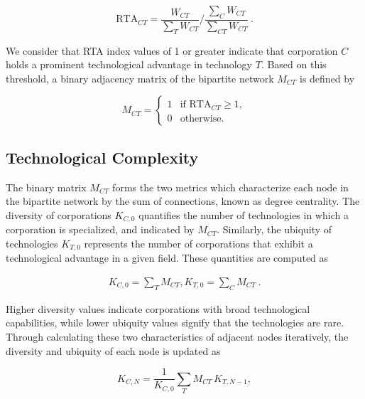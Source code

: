 \documentclass[fleqn,10pt]{wlscirep}
\begin{document}
\begin{center} \label{eq1}
    \begin{equation}
    \mbox{RTA}_{CT} = \frac{W_{CT}}{\sum_{T} W_{CT}} \Bigg/ \frac{\sum_{C} W_{CT}}{\sum_{CT} W_{CT}}~.
    \end{equation}
\end{center}
We consider that RTA index values of 1 or greater indicate that corporation \(C\) holds a prominent technological advantage in technology \(T\). Based on this threshold, a binary adjacency matrix of the bipartite network \(M_{CT}\) is defined by

\begin{center}
\begin{equation} \label{eq2}
M_{CT} = 
\begin{cases} 
1 & \text{if } \mbox{RTA}_{CT} \geq 1, \\
0 & \text{otherwise}.
\end{cases}
\end{equation}
\end{center}


\subsection*{Technological Complexity} \label{TCI}
The binary matrix \(M_{CT}\) forms the two metrics which characterize each node in the bipartite network by the sum of connections, known as degree centrality. The diversity of corporations \(K_{C,0}\) quantifies the number of technologies in which a corporation is specialized, and indicated by $M_{CT}$. 
Similarly, the ubiquity of technologies \(K_{T,0}\) represents the number of corporations that exhibit a technological advantage in a given field. These quantities are computed as

\begin{equation}\label{eq3}
\begin{aligned}
K_{C,0} = \sum_{T} M_{CT},  
K_{T,0} = \sum_{C} M_{CT}~.
\end{aligned}
\end{equation}

Higher diversity values indicate corporations with broad technological capabilities, while lower ubiquity values signify that the technologies are rare. 
Through calculating these two characteristics of adjacent nodes iteratively, the diversity and ubiquity of each node is updated as

\begin{equation}\label{eq4}
K_{C,N} = \frac{1}{K_{C,0}} \sum_{T} M_{CT}\, K_{T,N-1},
\end{equation}
\end{document}

